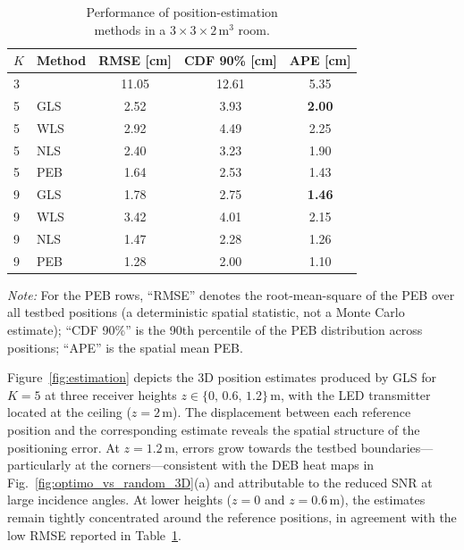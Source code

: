 \documentclass[journal]{IEEEtran}
\newcommand{\added}[1]{{\color{blue}#1}}
\begin{document}
\begin{table}[t]
\centering
\caption{Performance of position-estimation\\ methods in a \(3\times3\times2\,\mathrm{m^3}\) room.}
\label{tab:estimation_performance}
\begin{tabular}{|l| l |c |c| c|}
\hline
\textbf{$K$} & \textbf{Method} & \textbf{RMSE [cm]} & \textbf{CDF 90\% [cm]} & \textbf{APE [cm]} \\ \hline
3 & \cite{Chassagne2025} & 11.05 & 12.61 &  5.35 \\ \hline
5 & GLS   &  2.52 &  3.93 &  \textbf{2.00} \\ \hline
5 & WLS   &  2.92 &  4.49 &  2.25 \\ \hline
5 & NLS   &  2.40 &  3.23 &  1.90 \\ \hline
5 & PEB   &  1.64 &  2.53 &  1.43 \\ \hline
9 & GLS   &  1.78 &  2.75 &  \textbf{1.46} \\ \hline
9 & WLS   &  3.42 &  4.01 &  2.15 \\ \hline
9 & NLS   &  1.47 &  2.28 &  1.26 \\ \hline
9 & PEB   &  1.28 &  2.00 &  1.10 \\ \hline
\end{tabular}
\vspace{2pt}
\added{\footnotesize\textit{Note:} For the PEB rows, ``RMSE'' denotes the root-mean-square of the PEB over all testbed positions (a deterministic spatial statistic, not a Monte Carlo estimate); ``CDF 90\%'' is the 90th percentile of the PEB distribution across positions; ``APE'' is the spatial mean PEB.}
\end{table}

Figure~\ref{fig:estimation} depicts the 3D position estimates produced by GLS for \(K{=}5\) at three receiver heights \(z\in\{0,\,0.6,\,1.2\}\,\mathrm{m}\), with the LED transmitter located at the ceiling (\(z=2\,\mathrm{m}\)). The displacement between each reference position and the corresponding estimate reveals the spatial structure of the positioning error. At \(z=1.2\,\mathrm{m}\), errors grow towards the testbed boundaries—particularly at the corners—consistent with the DEB heat maps in Fig.~\ref{fig:optimo_vs_random_3D}(a) and attributable to the reduced SNR at large incidence angles. At lower heights (\(z=0\) and \(z=0.6\,\mathrm{m}\)), the estimates remain tightly concentrated around the reference positions, in agreement with the low RMSE reported in Table~\ref{tab:estimation_performance}.
\end{document}
